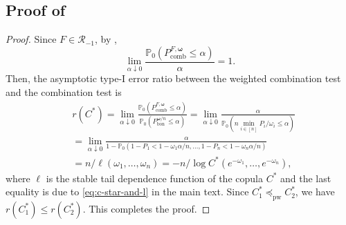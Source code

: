 \documentclass[12pt]{article}
\theoremstyle{plain}
\theoremstyle{plain}
\theoremstyle{definition}
\renewcommand{\Pr}{\mathbb{P}}
\begin{document}
\subsection{Proof of }
\label{subsec:proof-bonferroni-dependence}
\BonferroniDependence*
\begin{proof}
Since $F\in\mathscr{R}_{-1}$, by ,
\[
\lim_{\alpha\downarrow0}\frac{\Pr_0\left(P_\mathrm{comb}^{F, \bm \omega}\leq \alpha\right)}{\alpha}=1.
\]
Then, the asymptotic type-I error ratio between the weighted combination test and the combination test is
\begin{align*}
&r(C^*)
=\lim_{\alpha\downarrow0}\frac{\Pr_0\left(P^{F,\bm{\omega}}_\mathrm{comb}\leq \alpha\right)}{\Pr_0\left(P^{\bm{\omega}/n}_{\mathrm{bon}}\leq \alpha\right)}
=\lim_{\alpha\downarrow0}\frac{\alpha}{\Pr_0(n\min_{i\in[n]} P_i/\omega_i\le\alpha)}\\
&=\lim_{\alpha\downarrow0}\frac{\alpha}{1-\Pr_0(1-P_1<1-\omega_1\alpha/n,\dots,1-P_n<1-\omega_n\alpha/n)}\\
&=n/\ell(\omega_1,\dots,\omega_n) = -n/\log C^*(e^{-\omega_1},\ldots,e^{-\omega_n}) ,
\end{align*}
where $\ell$ is the stable tail dependence function of the copula $C^*$ and the last equality is due to \eqref{eq:c-star-and-l} in the main text. 
  Since $C^*_1\preceq_{\mathrm{pw}}C^*_2$, %
we have $ 
r(C_1^*)\le r(C_2^*).
$ This completes the proof.
\end{proof}
\end{document}
